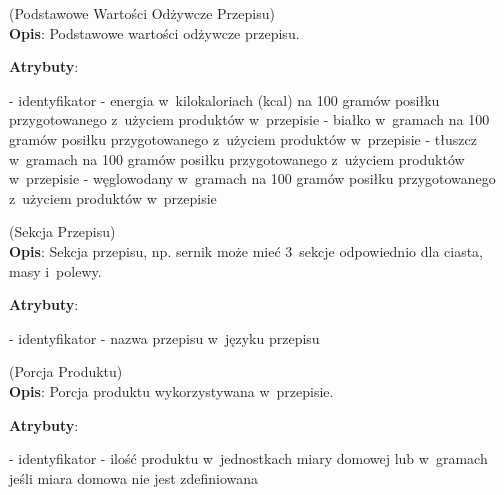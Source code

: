 \begin{enumerate}[label={\textbf{KAT/3/\protect\twodigits{\theenumi}}}, wide, labelwidth=!, labelindent=0pt, labelsep=0pt, series=reqs]
    \label{kat:RecipeBasicNutritionData} (Podstawowe Wartości Odżywcze Przepisu)\\
    \indent\textbf{Opis}: Podstawowe wartości odżywcze przepisu.
    \par
    \textbf{Atrybuty}:
    \begin{itemize}[series=atr, wide, align=left, leftmargin=190pt]
        \label{kat:RecipeBasicNutritionData:id}- identyfikator
        \label{kat:RecipeBasicNutritionData:energy}- energia w~kilokaloriach (kcal) na 100 gramów posiłku przygotowanego z~użyciem produktów w~przepisie
        \label{kat:RecipeBasicNutritionData:protein}- białko w~gramach na 100 gramów posiłku przygotowanego z~użyciem produktów w~przepisie
        \label{kat:RecipeBasicNutritionData:fat}- tłuszcz w~gramach na 100 gramów posiłku przygotowanego z~użyciem produktów w~przepisie
        \label{kat:RecipeBasicNutritionData:carbohydrates}- węglowodany w~gramach na 100 gramów posiłku przygotowanego z~użyciem produktów w~przepisie
    \end{itemize}

    \label{kat:RecipeSection} (Sekcja Przepisu)\\
    \indent\textbf{Opis}: Sekcja przepisu, np. sernik może mieć 3~sekcje odpowiednio dla ciasta, masy i~polewy.
    \par
    \textbf{Atrybuty}:
    \begin{itemize}[series=atr, wide, align=left, leftmargin=190pt]
        \label{kat:RecipeSection:id}- identyfikator
        \label{kat:RecipeSection:sectionName}- nazwa przepisu w~języku przepisu
    \end{itemize}

    \label{kat:ProductPortion} (Porcja Produktu)\\
    \indent\textbf{Opis}: Porcja produktu wykorzystywana w~przepisie.
    \par
    \textbf{Atrybuty}:
    \begin{itemize}[series=atr, wide, align=left, leftmargin=190pt]
        \label{kat:ProductPortion:id}- identyfikator
        \label{kat:ProductPortion:amount}- ilość produktu w~jednostkach miary domowej lub w~gramach jeśli miara domowa nie jest zdefiniowana
    \end{itemize}


\end{enumerate}
